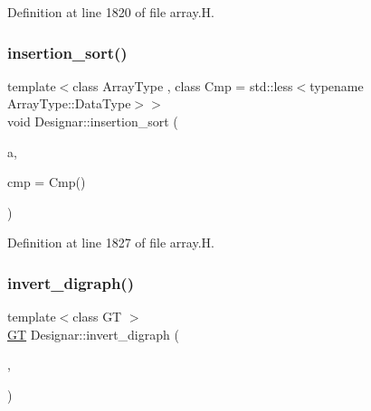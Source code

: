 Definition at line 1820 of file array.\+H.

\mbox{\label{namespace_designar_a93966614af4a5a6c0bd78fe75af5e7cf}} 
\subsubsection{\texorpdfstring{insertion\+\_\+sort()}{insertion\_sort()}\hspace{0.1cm}{\footnotesize\ttfamily [6/6]}}
{\footnotesize\ttfamily template$<$class Array\+Type , class Cmp  = std\+::less$<$typename Array\+Type\+::\+Data\+Type$>$$>$ \\
void Designar\+::insertion\+\_\+sort (\begin{DoxyParamCaption}\item[{Array\+Type \&}]{a,  }\item[{Cmp \&\&}]{cmp = {\ttfamily Cmp()} }\end{DoxyParamCaption})\hspace{0.3cm}{\ttfamily [inline]}}



Definition at line 1827 of file array.\+H.

\mbox{\label{namespace_designar_a35a0d2875876e94cc6f9036f85491091}} 
\subsubsection{\texorpdfstring{invert\+\_\+digraph()}{invert\_digraph()}\hspace{0.1cm}{\footnotesize\ttfamily [1/2]}}
{\footnotesize\ttfamily template$<$class GT $>$ \\
\hyperlink{demo-buildgraph_8_c_a3001c40d2c31ca87ed96cd7d1334a55e}{GT} Designar\+::invert\+\_\+digraph (\begin{DoxyParamCaption}\item[{\hyperlink{demo-buildgraph_8_c_a3001c40d2c31ca87ed96cd7d1334a55e}{GT} \&}]{,  }\item[{bool}]{ }\end{DoxyParamCaption})}

\mbox{\label{namespace_designar_a3f14dc1be082db37ea18784d48c92a54}} 
